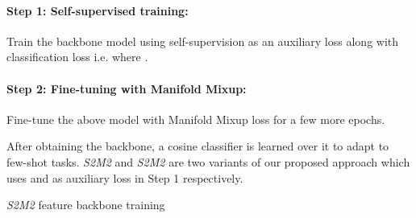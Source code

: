 \documentclass[10pt,twocolumn,letterpaper]{article}
\begin{document}
\paragraph{Step 1: Self-supervised training:} Train the backbone model using self-supervision as an auxiliary loss along with classification loss i.e.  where . 
\vspace{-3pt}
\paragraph{Step 2: Fine-tuning with Manifold Mixup:} Fine-tune the above model with Manifold Mixup loss  for a few more epochs. 

After obtaining the backbone, a cosine classifier is learned over it to adapt to few-shot tasks. \textit{S2M2} and \textit{S2M2} are two variants of our proposed approach which uses  and  as auxiliary loss in Step 1 respectively.


\begin{algorithm}[t]
\SetAlgoLined
{}
 \caption{\footnotesize{\textit{S2M2} feature backbone training}}
\label{feature_adv_train_algo}
\end{algorithm}
\end{document}
